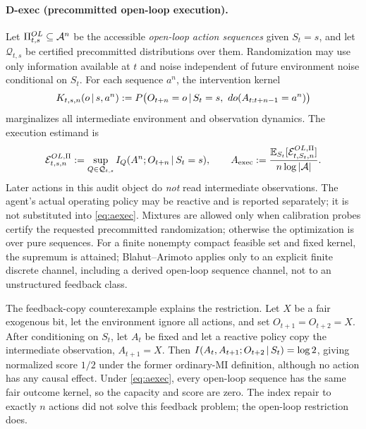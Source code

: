 \paragraph{D-exec (precommitted open-loop execution).} Let
$\Pi^{OL}_{t,s}\subseteq\mathcal{A}^n$ be the accessible \emph{open-loop action
sequences} given $S_t=s$, and let $\mathcal Q_{t,s}$ be certified precommitted
distributions over them. Randomization may use only information available at
$t$ and noise independent of future environment noise conditional on $S_t$.
For each sequence $a^n$, the intervention kernel
\[
K_{t,s,n}(o\,|\, s,a^n)
:=P\bigl(O_{t+n}=o\,|\, S_t=s,\ do(A_{t:t+n-1}=a^n)\bigr)
\]
marginalizes all intermediate environment and observation dynamics. The
execution estimand is
\begin{equation}\label{eq:aexec}
\mathcal{E}^{OL,\Pi}_{t,s,n}
:=\sup_{Q\in\mathcal Q_{t,s}} I_Q(A^n;O_{t+n}\,|\, S_t=s),\qquad
A_{\mathrm{exec}}:=\frac{\mathbb E_{S_t}[\mathcal{E}^{OL,\Pi}_{t,S_t,n}]}
{n\log|\mathcal{A}|}.
\end{equation}
Later actions in this audit object do \emph{not} read intermediate
observations. The agent's actual operating policy may be reactive and is
reported separately; it is not substituted into \eqref{eq:aexec}. Mixtures are
allowed only when calibration probes certify the requested precommitted
randomization; otherwise the optimization is over pure sequences. For a finite
nonempty compact feasible set and fixed kernel, the supremum is attained;
Blahut--Arimoto applies only to an explicit finite discrete channel, including
a derived open-loop sequence channel, not to an unstructured feedback class.

The feedback-copy counterexample explains the restriction. Let $X$ be a fair
exogenous bit, let the environment ignore all actions, and set
$O_{t+1}=O_{t+2}=X$. After conditioning on $S_t$, let $A_t$ be fixed and let a
reactive policy copy the intermediate observation, $A_{t+1}=X$. Then
$I(A_t,A_{t+1};O_{t+2}\,|\, S_t)=\log2$, giving normalized score $1/2$ under
the former ordinary-MI definition, although no action has any causal effect.
Under \eqref{eq:aexec}, every open-loop sequence has the same fair outcome
kernel, so the capacity and score are zero. The index repair to exactly $n$
actions did not solve this feedback problem; the open-loop restriction does.

